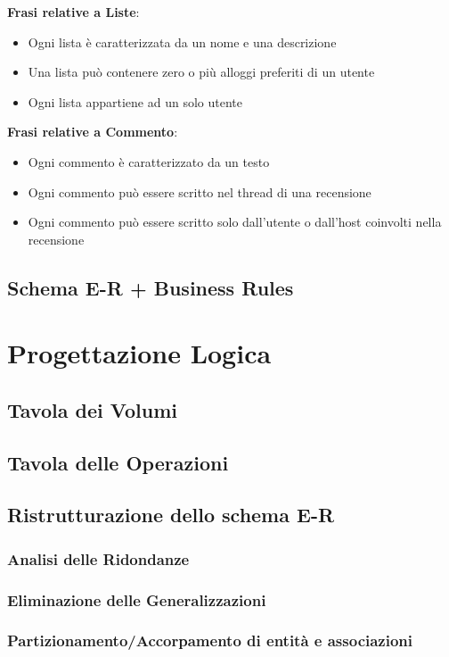 \documentclass[letterpaper]{report}
\begin{document}
\bigskip
\textbf{Frasi relative a Liste}:
\begin{itemize}
    \item Ogni lista è caratterizzata da un nome e una descrizione
    \item Una lista può contenere zero o più alloggi preferiti di un utente
    \item Ogni lista appartiene ad un solo utente
\end{itemize}
\bigskip
\textbf{Frasi relative a Commento}:
\begin{itemize}
    \item Ogni commento è caratterizzato da un testo
    \item Ogni commento può essere scritto nel thread di una recensione
    \item Ogni commento può essere scritto solo dall'utente o dall'host coinvolti nella recensione
\end{itemize}


\section{Schema E-R + Business Rules}

\chapter{Progettazione Logica}
\section{Tavola dei Volumi}
\section{Tavola delle Operazioni}
\section{Ristrutturazione dello schema E-R}
\subsection{Analisi delle Ridondanze}
\subsection{Eliminazione delle Generalizzazioni}
\subsection{Partizionamento/Accorpamento di entità e associazioni}
\end{document}
